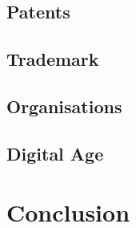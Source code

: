 \documentclass[a4paper]{report}
\begin{document}
\section{Patents}
\label{sec:Patents}

\section{Trademark}
\label{sec:Trademark}

\section{Organisations}
\label{sec:Orgas}

\section{Digital Age}
\label{sec:Digital age}

\chapter{Conclusion}

\newpage

\printbibliography
\end{document}
